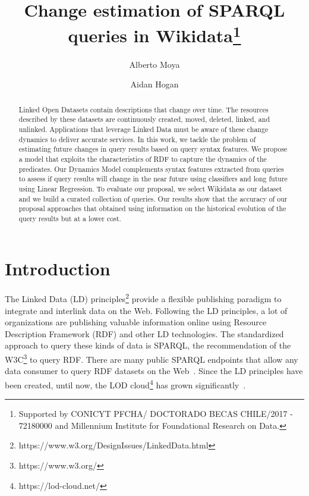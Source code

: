 \documentclass[runningheads]{llncs}
\begin{document}
%
\title{Change estimation of SPARQL queries in Wikidata\thanks{Supported by CONICYT PFCHA/ DOCTORADO BECAS CHILE/2017 - 72180000 and Millennium Institute for Foundational Research on Data.}}
%
%
\author{Alberto Moya \and
Aidan Hogan}%
%
%
%
\maketitle              %
%
\begin{abstract}
Linked Open Datasets contain descriptions that change over time. The resources described by these datasets are continuously created, moved, deleted, linked, and unlinked. Applications that leverage Linked Data must be aware of these change dynamics to deliver accurate services. In this work, we tackle the problem of estimating future changes in query results based on query syntax features. We propose a model that exploits the characteristics of RDF to capture the dynamics of the predicates. Our Dynamics Model complements syntax features extracted from queries to assess if query results will change in the near future using classifiers and long future using Linear Regression. To evaluate our proposal, we select Wikidata as our dataset and we build a curated collection of queries. Our results show that the accuracy of our proposal approaches that obtained using information on the historical evolution of the query results but at a lower cost.

\end{abstract}
%
%
\section{Introduction}
\label{sec:intro}
%
The Linked Data (LD) principles\footnote{https://www.w3.org/DesignIssues/LinkedData.html} provide a flexible publishing paradigm to integrate and interlink data on the Web. Following the LD principles, a lot of organizations are publishing valuable information online using Resource Description Framework (RDF) and other LD technologies. The standardized approach to query these kinds of data is SPARQL, the recommendation of the W3C\footnote{https://www.w3.org/} to query RDF. There are many public SPARQL endpoints that allow any data consumer to query RDF datasets on the Web~\cite{VandenbusscheUM17}. Since the LD principles have been created, until now, the LOD cloud\footnote{https://lod-cloud.net/} has grown significantly~\cite{SchmachtenbergBP14}. 
\end{document}
